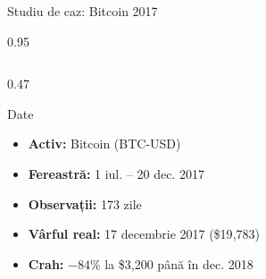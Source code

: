 \documentclass[9pt, aspectratio=169, t]{beamer}
\begin{document}
\begin{frame}{Studiu de caz: Bitcoin 2017}
    \begin{cminipage}{0.95\textwidth}
    {\footnotesize
    \begin{columns}[T]
        \begin{column}{0.47\textwidth}
            \begin{block}{Date}
                \begin{itemize}\setlength{\itemsep}{0pt}
                    \item \textbf{Activ:} Bitcoin (BTC-USD)
                    \item \textbf{Fereastră:} 1 iul. -- 20 dec. 2017
                    \item \textbf{Observații:} 173 zile
                    \item \textbf{Vârful real:} 17 decembrie 2017 (\$19{,}783)
                    \item \textbf{Crah:} $-84\%$ la \$3{,}200 până în dec. 2018
                \end{itemize}
            \end{block}


\end{column}
\end{columns}}
\end{cminipage}
\end{frame}
\end{document}
